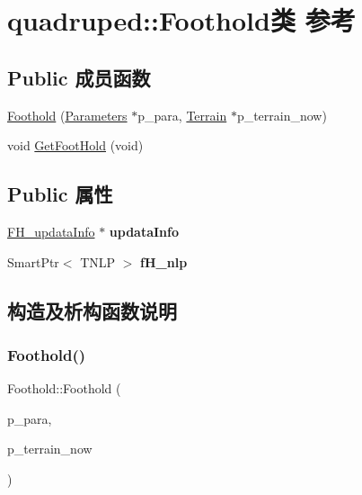 \hypertarget{classquadruped_1_1Foothold}{}\section{quadruped\+:\+:Foothold类 参考}
\label{classquadruped_1_1Foothold}
\subsection*{Public 成员函数}
\begin{DoxyCompactItemize}
\item 
\hyperlink{classquadruped_1_1Foothold_ac819b1b86d952ee70953e0f03444ac2a}{Foothold} (\hyperlink{classquadruped_1_1Parameters}{Parameters} $\ast$p\+\_\+para, \hyperlink{classquadruped_1_1Terrain}{Terrain} $\ast$p\+\_\+terrain\+\_\+now)
\item 
void \hyperlink{classquadruped_1_1Foothold_a3731827dcb2f4e75e3ff701f0b04d962}{Get\+Foot\+Hold} (void)
\end{DoxyCompactItemize}
\subsection*{Public 属性}
\begin{DoxyCompactItemize}
\item 
\mbox{\label{classquadruped_1_1Foothold_a6158308a079a360f4d92a5ee619f1cdb}} 
\hyperlink{classquadruped_1_1FH__updataInfo}{F\+H\+\_\+updata\+Info} $\ast$ {\bfseries updata\+Info}
\item 
\mbox{\label{classquadruped_1_1Foothold_a2bd27fdd1d09e8b75cde6ffe41f15c56}} 
Smart\+Ptr$<$ T\+N\+LP $>$ {\bfseries f\+H\+\_\+nlp}
\end{DoxyCompactItemize}


\subsection{构造及析构函数说明}
\mbox{\label{classquadruped_1_1Foothold_ac819b1b86d952ee70953e0f03444ac2a}} 
\subsubsection{\texorpdfstring{Foothold()}{Foothold()}}
{\footnotesize\ttfamily Foothold\+::\+Foothold (\begin{DoxyParamCaption}\item[{\hyperlink{classquadruped_1_1Parameters}{Parameters} $\ast$}]{p\+\_\+para,  }\item[{\hyperlink{classquadruped_1_1Terrain}{Terrain} $\ast$}]{p\+\_\+terrain\+\_\+now }\end{DoxyParamCaption})\hspace{0.3cm}{\ttfamily [explicit]}}

